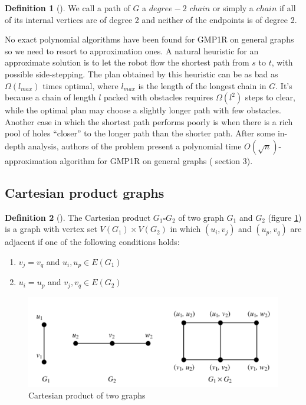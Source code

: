 \documentclass[12pt, a4paper]{article}
\theoremstyle{definition}
\newtheorem{definition}{Definition}[section]
\begin{document}
\begin{definition}[]
We call a path of $G$ a $degree-2$ $chain$ or simply a $chain$
if all of its internal vertices are of degree 2 and neither
of the endpoints is of degree 2.
\end{definition}

No exact polynomial algorithms have been found for GMP1R on general graphs so we need to resort to approximation ones.
A natural heuristic for an approximate solution is to let the robot flow the shortest path from $s$ to $t$, with possible side-stepping.
The plan obtained by this heuristic can be as bad as $\Omega(l_{max})$ times optimal, where $l_{max}$ is the length
of the longest chain in $G$.
It's because a chain of length $l$ packed with obstacles requires
$\Omega(l^2)$ steps to clear, while the optimal plan may choose a slightly longer path with few obstacles.
Another case in which the shortest path performs poorly is when there is a rich pool of holes “closer” to the longer path than the shorter path.
After some in-depth analysis, authors of the problem \cite{365740} present a polynomial time $O(\sqrt n)$-approximation algorithm
for GMP1R on general graphs (\cite{365740} section 3).

\subsection*{Cartesian product graphs}

\begin{definition}[]
  The Cartesian product $G_1 \square G_2$ of two graph $G_1$ and $G_2$ (figure \ref{cartesian}) is a graph with vertex set $V(G_1) \times V(G_2)$ in which
  $(u_i, v_j)$ and $(u_p, v_q)$ are adjacent if one of the
  following conditions holds:

  \begin{enumerate}
    \item $v_j = v_q$ and ${u_i,u_p} \in E(G_1)$
    \item $u_i = u_p$ and ${v_j,v_q} \in E(G_2)$
  \end{enumerate}
\end{definition}

\begin{figure}[H]
  \begin{center}
  \includegraphics[scale=0.5]{Cartesian.png}
  \caption{Cartesian product of two graphs}
  \label{cartesian}
  \end{center}
\end{figure}
\end{document}
